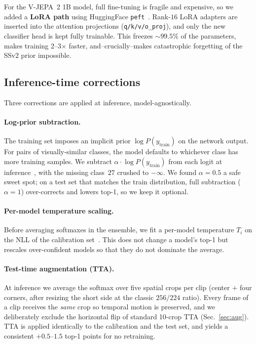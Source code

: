 \documentclass[10pt,twocolumn,letterpaper]{article}
\begin{document}
For the V-JEPA~2 1B model, full fine-tuning is fragile and expensive,
so we added a \textbf{LoRA path} using HuggingFace
\texttt{peft}~\cite{Hu22lora}. Rank-$16$ LoRA adapters are inserted into
the attention projections (\texttt{q/k/v/o\_proj}), and only the new
classifier head is kept fully trainable. This freezes
$\sim$$99.5\%$ of the parameters, makes training 2--3$\times$ faster,
and--crucially--makes catastrophic forgetting of the SSv2 prior
impossible.

\subsection{Inference-time corrections}

Three corrections are applied at inference, model-agnostically.

\paragraph{Log-prior subtraction.} The training set imposes an implicit
prior $\log P(y_{\text{train}})$ on the network output. For pairs of
visually-similar classes, the model defaults to whichever class has more
training samples. We subtract $\alpha \cdot \log P(y_{\text{train}})$
from each logit at inference~\cite{Menon20logitadj}, with the missing
class~$27$ crushed to $-\infty$. We found $\alpha=0.5$ a safe sweet spot;
on a test set that matches the train distribution, full subtraction
($\alpha=1$) over-corrects and lowers top-1, so we keep it optional.

\paragraph{Per-model temperature scaling.} Before averaging softmaxes
in the ensemble, we fit a per-model temperature $T_i$ on the NLL of the
calibration set~\cite{Guo17calibration}. This does not change a model's
top-1 but rescales over-confident models so that they do not dominate
the average.

\paragraph{Test-time augmentation (TTA).}
\label{sec:tta}
At inference we average the softmax over five spatial crops per clip
(center $+$ four corners, after resizing the short side at the classic
$256/224$ ratio). Every frame of a clip receives the \emph{same} crop so
temporal motion is preserved, and we deliberately exclude the
horizontal flip of standard 10-crop TTA (Sec.~\ref{sec:aug}). TTA is
applied identically to the calibration and the test set, and yields a
consistent $+0.5$--$1.5$ top-1 points for no retraining.
\end{document}
